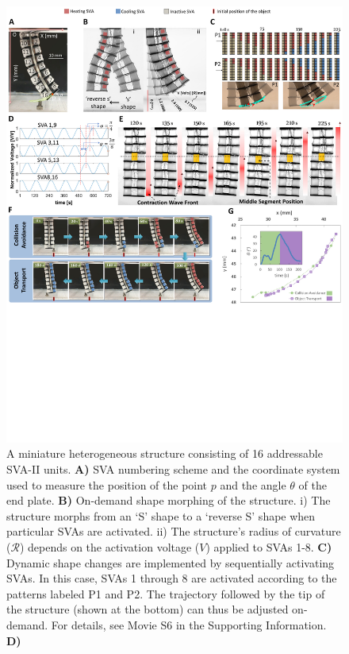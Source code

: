 \begin{figure}[t]
\centering
\includegraphics[width=\textwidth]{fig4.pdf}
\caption{A miniature heterogeneous structure consisting of 16 addressable SVA-II units. \textbf{A)} SVA numbering scheme and the coordinate system used to measure the position of the point $p$ and the angle $\theta$ of the end plate. \textbf{B)} On-demand shape morphing of the structure. i) The structure morphs from an `S' shape to a `reverse S' shape when particular SVAs are activated. 
ii) The structure's radius of curvature ($\mathcal{R}$) depends on the activation voltage ($V$) applied to SVAs 1-8. \textbf{C)} Dynamic shape changes are implemented by sequentially activating SVAs. In this case, SVAs 1 through 8 are activated according to the patterns labeled P1 and P2. The trajectory followed by the tip of the structure (shown at the bottom) can thus be adjusted on-demand. For details, see Movie S6 in the Supporting Information. \textbf{D)} 
}
\end{figure}
